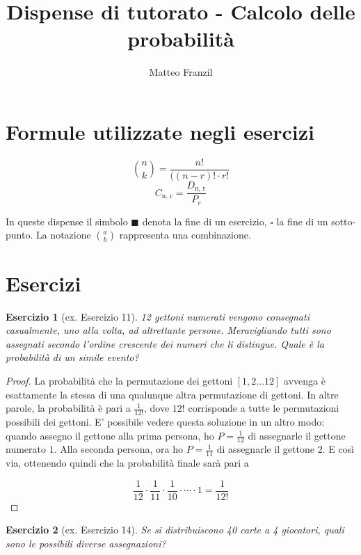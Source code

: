 \documentclass[12pt]{article}
\newtheorem{theorem}{Esercizio}
\begin{document}
\title{Dispense di tutorato - Calcolo delle probabilità}
\author{Matteo Franzil}
\maketitle

\section{Formule utilizzate negli esercizi}

$$
{n \choose k} = \frac{n!}{((n-r)! \cdot r!}
$$
$$
C_{\text{n, r}} = \frac{D_{\text{n, r}}}{P_r}
$$

In queste dispense il simbolo $\blacksquare$ denota la fine di un esercizio, $\square$ la fine di un sotto-punto. La notazione ${a \choose b}$ rappresenta una combinazione.

\section{Esercizi}

\begin{theorem}[ex. Esercizio 11]
12 gettoni numerati vengono consegnati casualmente, uno alla volta, ad altrettante persone. Meravigliando tutti sono assegnati secondo l'ordine crescente dei numeri che li distingue. Quale è la probabilità di un simile evento?
\end{theorem}

\begin{proof}
La probabilità che la permutazione dei gettoni $[1, 2...12]$ avvenga è esattamente la stessa di una qualunque altra permutazione di gettoni. In altre parole, la probabilità è pari a $\frac{1}{12!}$, dove $12!$ corrisponde a tutte le permutazioni possibili dei gettoni. E' possibile vedere questa soluzione in un altro modo: quando assegno il gettone alla prima persona, ho $P = \frac{1}{12}$ di assegnarle il gettone numerato $1$. Alla seconda persona, ora ho $P =\frac{1}{11}$ di assegnarle il gettone $2$. E così via, ottenendo quindi che la probabilità finale sarà pari a 

$$\frac{1}{12} \cdot \frac{1}{11} \cdot \frac{1}{10} \cdot \cdots \cdot 1 = \frac{1}{12!}
$$

\end{proof}

\begin{theorem}[ex. Esercizio 14]
Se si distribuiscono 40 carte a 4 giocatori, quali sono le possibili diverse assegnazioni?
\end{theorem}
\end{document}
